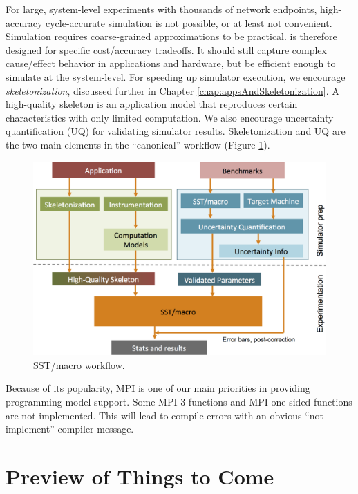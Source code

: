 For large, system-level experiments with thousands of network endpoints, high-accuracy cycle-accurate simulation is not possible,
or at least not convenient.
Simulation requires coarse-grained approximations to be practical.
\sstmacro is therefore designed for specific cost/accuracy tradeoffs.
It should still capture complex cause/effect behavior in applications and hardware, but be efficient enough to simulate at the system-level. 
For speeding up simulator execution, we encourage \textit{skeletonization}, discussed further in Chapter \ref{chap:appsAndSkeletonization}. 
A high-quality skeleton is an application model that reproduces certain characteristics with only limited computation.  
We also encourage uncertainty quantification (UQ) for validating simulator results.
Skeletonization and UQ are the two main elements in the ``canonical'' \sstmacro workflow (Figure \ref{fig:workflow}).

\begin{figure}[t]
  \centering
    \includegraphics[width=0.99\columnwidth]{figures/workflow.png}
      \caption{SST/macro workflow.}
      \label{fig:workflow}
\end{figure}

Because of its popularity, MPI is one of our main priorities in providing programming model support.  
Some MPI-3 functions and MPI one-sided functions are not implemented.
This will lead to compile errors with an obvious ``not implement'' compiler message.

\section{Preview of Things to Come}
\label{sec:preview}

